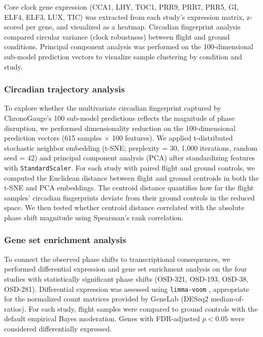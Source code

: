 \documentclass[11pt,a4paper]{article}
\begin{document}
Core clock gene expression (CCA1, LHY, TOC1, PRR9, PRR7, PRR5, GI, ELF4, ELF3, LUX, TIC) was extracted from each study's expression matrix, z-scored per gene, and visualized as a heatmap. Circadian fingerprint analysis compared circular variance (clock robustness) between flight and ground conditions. Principal component analysis was performed on the 100-dimensional sub-model prediction vectors to visualize sample clustering by condition and study.

\subsubsection*{Circadian trajectory analysis}

To explore whether the multivariate circadian fingerprint captured by ChronoGauge's 100 sub-model predictions reflects the magnitude of phase disruption, we performed dimensionality reduction on the 100-dimensional prediction vectors (615 samples $\times$ 100 features). We applied t-distributed stochastic neighbor embedding (t-SNE; perplexity = 30, 1,000 iterations, random seed = 42) and principal component analysis (PCA) after standardizing features with \texttt{StandardScaler}. For each study with paired flight and ground controls, we computed the Euclidean distance between flight and ground centroids in both the t-SNE and PCA embeddings. The centroid distance quantifies how far the flight samples' circadian fingerprints deviate from their ground controls in the reduced space. We then tested whether centroid distance correlated with the absolute phase shift magnitude using Spearman's rank correlation.

\subsubsection*{Gene set enrichment analysis}

To connect the observed phase shifts to transcriptional consequences, we performed differential expression and gene set enrichment analysis on the four studies with statistically significant phase shifts (OSD-321, OSD-193, OSD-38, OSD-281). Differential expression was assessed using \texttt{limma-voom} \citep{Ritchie2015}, appropriate for the normalized count matrices provided by GeneLab (DESeq2 median-of-ratios). For each study, flight samples were compared to ground controls with the default empirical Bayes moderation. Genes with FDR-adjusted $p < 0.05$ were considered differentially expressed.
\end{document}

